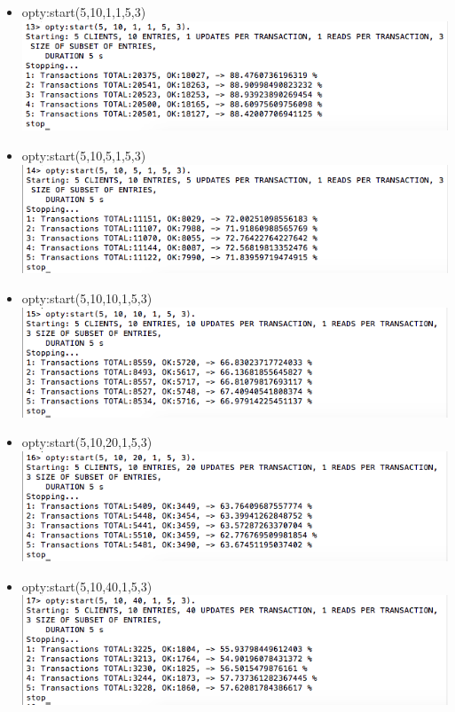 \documentclass[a4paper, 11pt]{article}
\begin{document}
\begin{itemize}
\item opty:start(5,10,1,1,5,3)\\
\includegraphics[scale=0.5]{images/exp-iii-1.png} \\
\item opty:start(5,10,5,1,5,3)\\
\includegraphics[scale=0.5]{images/exp-iii-2.png} \\
\item opty:start(5,10,10,1,5,3)\\
\includegraphics[scale=0.5]{images/exp-iii-3.png} \\
\item opty:start(5,10,20,1,5,3)\\
\includegraphics[scale=0.5]{images/exp-iii-4.png} \\
\item opty:start(5,10,40,1,5,3)\\
\includegraphics[scale=0.5]{images/exp-iii-5.png} \\

\end{itemize}
\end{document}
